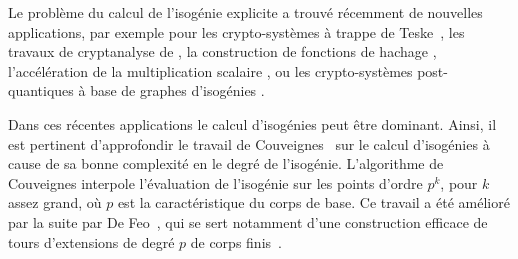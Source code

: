 \documentclass[10pt,a4paper]{book}
\theoremstyle{plain}
\theoremstyle{definition}
\theoremstyle{definition}
\theoremstyle{definition}
\theoremstyle{definition}
\theoremstyle{definition}
\theoremstyle{remark}
\theoremstyle{remark}
\theoremstyle{definition}
\begin{document}
Le problème du calcul de l'isogénie explicite a trouvé récemment de nouvelles 
applications, par exemple pour les crypto-systèmes à 
trappe de Teske~\cite{Teske06}, les travaux de cryptanalyse de 
 \cite{MaurerMenezesTeske01}, la construction de fonctions de hachage 
 \cite{CGL09}, l'accélération de la 
multiplication scalaire \cite{GallantLambertVanstone01,LongaSica14}, ou les 
crypto-systèmes post-quantiques à base de graphes d'isogénies 
\cite{Couveignes06} \cite{RostovtsevStolbunov06} \cite{DeFeoJaoPlut14}.

  

Dans ces récentes applications le calcul d'isogénies peut être dominant. 
Ainsi, il est pertinent d'approfondir le travail de Couveignes~\cite{Couveignes96} 
sur le calcul d'isogénies à cause de sa bonne complexité en le degré
de l'isogénie.
L'algorithme de Couveignes interpole l'évaluation de l'isogénie sur les points 
d'ordre $p^k$, pour $k$ assez grand, où $p$ est la caractéristique du corps de 
base. Ce travail a été amélioré par la suite par De Feo~\cite{DeFeo11}, qui se 
sert notamment d'une construction efficace de tours d'extensions de degré $p$ 
de corps finis~\cite{Couveignes00,DeFeo-Shost'12}.
\end{document}
